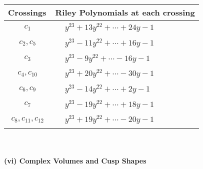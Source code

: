 \documentclass[1p]{elsarticle_modified}
\theoremstyle{definition}
\begin{document}
\begin{tabular}{m{50pt}|m{274pt}}
Crossings & \hspace{64pt}Riley Polynomials at each crossing \\
\hline $$\begin{aligned}c_{1}\end{aligned}$$&$\begin{aligned}
&y^{23}+13 y^{22}+\cdots+24 y-1
\end{aligned}$\\
\hline $$\begin{aligned}c_{2},c_{5}\end{aligned}$$&$\begin{aligned}
&y^{23}-11 y^{22}+\cdots+16 y-1
\end{aligned}$\\
\hline $$\begin{aligned}c_{3}\end{aligned}$$&$\begin{aligned}
&y^{23}-9 y^{22}+\cdots-16 y-1
\end{aligned}$\\
\hline $$\begin{aligned}c_{4},c_{10}\end{aligned}$$&$\begin{aligned}
&y^{23}+20 y^{22}+\cdots-30 y-1
\end{aligned}$\\
\hline $$\begin{aligned}c_{6},c_{9}\end{aligned}$$&$\begin{aligned}
&y^{23}-14 y^{22}+\cdots+2 y-1
\end{aligned}$\\
\hline $$\begin{aligned}c_{7}\end{aligned}$$&$\begin{aligned}
&y^{23}-19 y^{22}+\cdots+18 y-1
\end{aligned}$\\
\hline $$\begin{aligned}c_{8},c_{11},c_{12}\end{aligned}$$&$\begin{aligned}
&y^{23}+19 y^{22}+\cdots-20 y-1
\end{aligned}$\\
\hline
\end{tabular}\\~\\
\newpage\flushleft \textbf{(vi) Complex Volumes and Cusp Shapes}
\end{document}
